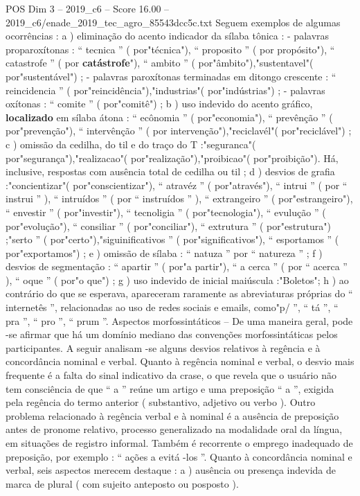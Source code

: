 \begin{textsample}{POS Dim 3 – 2019\_c6 – Score 16.00 – 2019\_c6/enade\_2019\_tec\_agro\_85543dcc5c.txt}
Seguem exemplos de algumas ocorrências : a ) eliminação do acento indicador da sílaba tônica : - palavras proparoxítonas : “ tecnica ” ( por"técnica"), “ proposito ” ( por propósito"), “ catastrofe ” ( por \textbf{catástrofe}"), “ ambito ” ( por"âmbito"),"sustentavel"( por"sustentável") ; - palavras paroxítonas terminadas em ditongo crescente : “ reincidencia ” ( por"reincidência"),"industrias"( por"indústrias") ; - palavras oxítonas : “ comite ” ( por"comitê") ; b ) uso indevido do acento gráfico, \textbf{localizado} em sílaba átona : “ ecônomia ” ( por"economia"), “ prevênção ” ( por"prevenção"), “ intervênção ” ( por intervenção"),"reciclavél"( por"reciclável") ; c ) omissão da cedilha, do til e do traço do T :"seguranca"( por"segurança"),"realizacao"( por"realização"),"proibicao"( por"proibição").
Há, inclusive, respostas com ausência total de cedilha ou til ; d ) desvios de grafia :"concientizar"( por"conscientizar"), “ atravéz ” ( por"através"), “ intrui ” ( por “ instrui ” ), “ intruídos ” ( por “ instruídos ” ), “ extrangeiro ” ( por"estrangeiro"), “ envestir ” ( por"investir"), “ tecnoligia ” ( por"tecnologia"), “ evulução ” ( por"evolução"), “ consiliar ” ( por"conciliar"), “ extrutura ” ( por"estrutura") ;"serto ” ( por"certo"),"siguinificativos ” ( por"significativos"), “ esportamos ” ( por"exportamos") ; e ) omissão de sílaba : “ natuza ” por “ natureza ” ; f ) desvios de segmentação : “ apartir ” ( por"a partir"), “ a cerca ” ( por “ acerca ” ), “ oque ” ( por"o que") ; g ) uso indevido de inicial maiúscula :"Boletos"; h ) ao contrário do que se esperava, apareceram raramente as abreviaturas próprias do “ internetês ”, relacionadas ao uso de redes sociais e emails, como"p/ ”, “ tá ”, “ pra ”, “ pro ”, “ prum ”.
Aspectos morfossintáticos – De uma maneira geral, pode -se afirmar que há um domínio mediano das convenções morfossintáticas pelos participantes.
A seguir analisam -se alguns desvios relativos à regência e à concordância nominal e verbal.
Quanto à regência nominal e verbal, o desvio mais frequente é a falta do sinal indicativo da crase, o que revela que o usuário não tem consciência de que “ a ” reúne um artigo e uma preposição “ a ”, exigida pela regência do termo anterior ( substantivo, adjetivo ou verbo ).
Outro problema relacionado à regência verbal e à nominal é a ausência de preposição antes de pronome relativo, processo generalizado na modalidade oral da língua, em situações de registro informal.
Também é recorrente o emprego inadequado de preposição, por exemplo : “ ações a evitá -los ”.
Quanto à concordância nominal e verbal, seis aspectos merecem destaque : a ) ausência ou presença indevida de marca de plural ( com sujeito anteposto ou posposto ).

\end{textsample}
